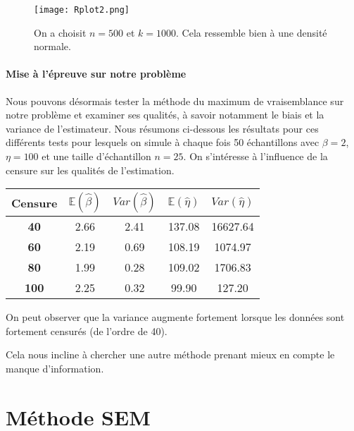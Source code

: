 \documentclass[a4paper]{report}
\begin{document}
\begin{figure}[!ht]
	\centering
     	\texttt{[image: Rplot2.png]}

	\caption{On a choisit $n=500$ et $k=1000$. Cela ressemble bien à une densité normale.}
\end{figure}

\subsubsection{Mise à l'épreuve sur notre problème}

Nous pouvons désormais tester la méthode du maximum de vraisemblance sur notre problème et examiner ses qualités, à savoir notamment le biais et la variance de l'estimateur. Nous résumons ci-dessous les résultats pour ces différents tests pour lesquels on simule à chaque fois 50 échantillons avec $\beta=2$, $\eta=100$ et une taille d'échantillon $n=25$. On s'intéresse à l'influence de la censure sur les qualités de l'estimation.

\begin{center}
\begin{tabular}{|c||c|c||c|c|}
	\hline
	\bf Censure &  $\mathbb{E}(\hat{\beta})$  &  $Var(\hat{\beta})$ &  $\mathbb{E}(\hat{\eta})$ &  $Var(\hat{\eta})$ \\
	\hline
	\bf 40 &2.66 & 2.41 & 137.08 &16627.64 \\
	\hline
	\bf 60 &2.19 & 0.69 & 108.19 & 1074.97\\
	\hline
	\bf 80 &1.99 & 0.28 &109.02 &1706.83 \\
	\hline
	\bf 100 &2.25 &0.32  & 99.90&  127.20\\
	\hline
\end{tabular}
\end{center}

On peut observer que la variance augmente fortement lorsque les données sont fortement censurés (de l'ordre de 40).

Cela nous incline à chercher une autre méthode prenant mieux en compte le manque d'information. 

  \chapter {Méthode SEM}




  
  
  
 
 
 
 
 
 
 
 
 
\end{document}
